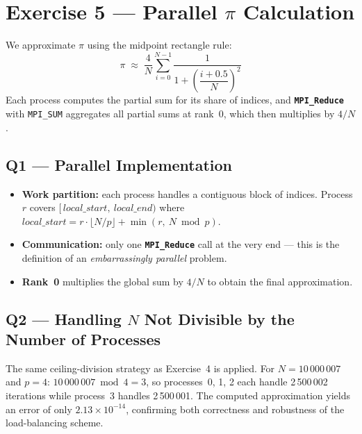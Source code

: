\documentclass[12pt,a4paper]{article}
\newcommand{\mpiname}[1]{\texttt{\textbf{#1}}}
\begin{document}
\newpage
\section{Exercise 5 — Parallel \(\pi\) Calculation}

We approximate $\pi$ using the midpoint rectangle rule:
\[
  \pi \;\approx\; \frac{4}{N} \sum_{i=0}^{N-1}
  \frac{1}{1 + \left(\dfrac{i + 0.5}{N}\right)^{\!2}}
\]
Each process computes the partial sum for its share of indices, and
\mpiname{MPI\_Reduce} with \texttt{MPI\_SUM} aggregates all partial sums
at rank~0, which then multiplies by $4/N$.

\subsection{Q1 — Parallel Implementation}

\begin{itemize}[leftmargin=1.5em]
  \item \textbf{Work partition:} each process handles a contiguous block
        of indices.  Process $r$ covers
        $[\,\textit{local\_start},\ \textit{local\_end})$ where
        $\textit{local\_start} = r \cdot \lfloor N/p \rfloor
        + \min(r,\ N \bmod p)$.
  \item \textbf{Communication:} only one \mpiname{MPI\_Reduce} call at
        the very end — this is the definition of an \emph{embarrassingly
        parallel} problem.
  \item \textbf{Rank~0} multiplies the global sum by $4/N$ to obtain
        the final approximation.
\end{itemize}

\subsection{Q2 — Handling $N$ Not Divisible by the Number of Processes}

\begin{answerbox}
The same ceiling-division strategy as Exercise~4 is applied.
For $N = 10\,000\,007$ and $p = 4$:
$10\,000\,007 \bmod 4 = 3$, so processes~0, 1, 2 each handle
2\,500\,002 iterations while process~3 handles 2\,500\,001.
The computed approximation yields an error of only $2.13 \times 10^{-14}$,
confirming both correctness and robustness of the load-balancing scheme.
\end{answerbox}
\end{document}
